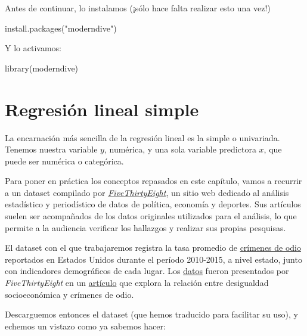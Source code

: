 \documentclass[
]{book}
\newenvironment{Shaded}{\begin{snugshade}}{\end{snugshade}}
\newcommand{\FunctionTok}[1]{\textcolor[rgb]{0.00,0.00,0.00}{#1}}
\newcommand{\NormalTok}[1]{#1}
\newcommand{\StringTok}[1]{\textcolor[rgb]{0.31,0.60,0.02}{#1}}
\begin{document}
Antes de continuar, lo instalamos (¡sólo hace falta realizar esto una vez!)

\begin{Shaded}
\begin{Highlighting}[]
\FunctionTok{install.packages}\NormalTok{(}\StringTok{"moderndive"}\NormalTok{)}
\end{Highlighting}
\end{Shaded}

Y lo activamos:

\begin{Shaded}
\begin{Highlighting}[]
\FunctionTok{library}\NormalTok{(moderndive)}
\end{Highlighting}
\end{Shaded}

\hypertarget{regresiuxf3n-lineal-simple}{%
\section{Regresión lineal simple}\label{regresiuxf3n-lineal-simple}}

La encarnación más sencilla de la regresión lineal es la simple o univariada. Tenemos nuestra variable \(y\), numérica, y una sola variable predictora \(x\), que puede ser numérica o categórica.

Para poner en práctica los conceptos repasados en este capítulo, vamos a recurrir a un dataset compilado por \href{https://fivethirtyeight.com/}{\emph{FiveThirtyEight}}, un sitio web dedicado al análisis estadístico y periodístico de datos de política, economía y deportes. Sus artículos suelen ser acompañados de los datos originales utilizados para el análisis, lo que permite a la audiencia verificar los hallazgos y realizar sus propias pesquisas.

El dataset con el que trabajaremos registra la tasa promedio de \href{https://victimconnect.org/tipos-de-delitos/crimenes-de-odio/}{crímenes de odio} reportados en Estados Unidos durante el período 2010-2015, a nivel estado, junto con indicadores demográficos de cada lugar. Los \href{https://github.com/fivethirtyeight/data/tree/master/hate-crimes}{datos} fueron presentados por \emph{FiveThirtyEight} en un \href{https://fivethirtyeight.com/features/higher-rates-of-hate-crimes-are-tied-to-income-inequality/}{artículo} que explora la relación entre desigualdad socioeconómica y crímenes de odio.

Descarguemos entonces el dataset (que hemos traducido para facilitar su uso), y echemos un vistazo como ya sabemos hacer:
\end{document}
